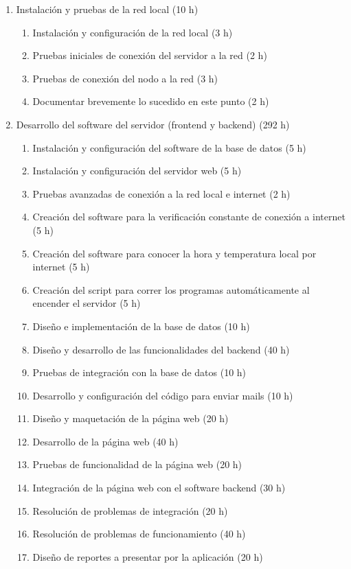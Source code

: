 \documentclass[
11pt, %
]{charter}
\begin{document}
\begin{enumerate}
\begin{enumerate}
	\end{enumerate}
\item Instalación y pruebas de la red local (10 h)
	\begin{enumerate}
		\item Instalación y configuración de la red local (3 h)
		\item Pruebas iniciales de conexión del servidor a la red (2 h)
		\item Pruebas de conexión del nodo a la red (3 h)
		\item Documentar brevemente lo sucedido en este punto (2 h)
	\end{enumerate}
\item Desarrollo del software del servidor (frontend y backend) (292 h)
	\begin{enumerate}
		\item Instalación y configuración del software de la base de datos (5 h)
		\item Instalación y configuración del servidor web (5 h)
		\item Pruebas avanzadas de conexión a la red local e internet (2 h)
		\item Creación del software para la verificación constante de conexión a internet (5 h)
		\item Creación del software para conocer la hora y temperatura local por internet (5 h)
		\item Creación del script para correr los programas automáticamente al encender el servidor (5 h)
		\item Diseño e implementación de la base de datos (10 h)
		\item Diseño y desarrollo de las funcionalidades del backend (40 h)
		\item Pruebas de integración con la base de datos (10 h)
		\item Desarrollo y configuración del código para enviar mails (10 h)
		\item Diseño y maquetación de la página web (20 h)
		\item Desarrollo de la página web (40 h)
		\item Pruebas de funcionalidad de la página web (20 h)
		\item Integración de la página web con el software backend (30 h)
		\item Resolución de problemas de integración (20 h)
		\item Resolución de problemas de funcionamiento (40 h)
		\item Diseño de reportes a presentar por la aplicación (20 h)

\end{enumerate}
\end{enumerate}
\end{document}

